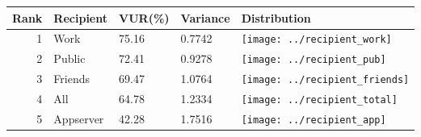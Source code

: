 \begin{table}[t]
\begin{center}
\small
\begin{tabular}{| r | p{3cm} | p{1cm} | p{1cm} | p{2cm} |}
\hline
Rank & Recipient & VUR(\%) & Variance & Distribution\\
\hline
1& Work & 75.16 & 0.7742& \texttt{[image: ../recipient\_work]}\\ 
2& Public & 72.41 & 0.9278& \texttt{[image: ../recipient\_pub]}\\ 
3& Friends & 69.47 & 1.0764 & \texttt{[image: ../recipient\_friends]}\\ 
4& All & 64.78 & 1.2334& \texttt{[image: ../recipient\_total]}\\ 
5& Appserver & 42.28 & 1.7516& \texttt{[image: ../recipient\_app]}\\ 
\hline
\end{tabular}
\end{center}
\end{table}